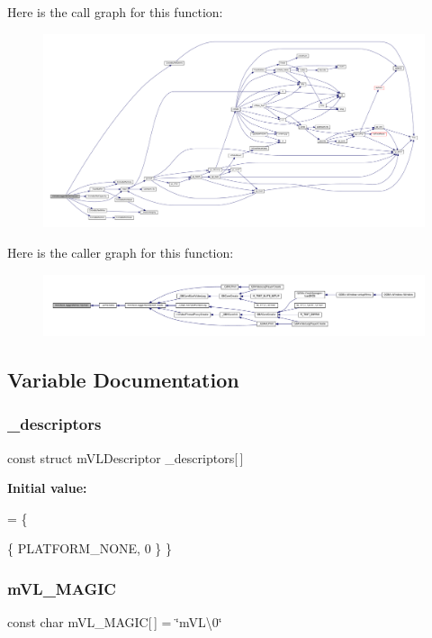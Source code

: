 Here is the call graph for this function\+:
\nopagebreak
\begin{figure}[H]
\begin{center}
\leavevmode
\includegraphics[width=350pt]{video-logger_8c_a4ff0364da23c84ee35e9e6cd4118a1bb_cgraph}
\end{center}
\end{figure}
Here is the caller graph for this function\+:
\nopagebreak
\begin{figure}[H]
\begin{center}
\leavevmode
\includegraphics[width=350pt]{video-logger_8c_a4ff0364da23c84ee35e9e6cd4118a1bb_icgraph}
\end{center}
\end{figure}


\subsection{Variable Documentation}
\mbox{\label{video-logger_8c_a787ded6be63576e12586e834b8a96b6b}} 
\subsubsection{\texorpdfstring{\+\_\+descriptors}{\_descriptors}}
{\footnotesize\ttfamily const struct m\+V\+L\+Descriptor  \+\_\+descriptors\mbox{[}$\,$\mbox{]}\hspace{0.3cm}{\ttfamily [static]}}

{\bfseries Initial value\+:}
\begin{DoxyCode}
= \{






    \{ PLATFORM\_NONE, 0 \}
\}
\end{DoxyCode}
\mbox{\label{video-logger_8c_a5d1620a649e7d23e38b4a81320d2e690}} 
\subsubsection{\texorpdfstring{m\+V\+L\+\_\+\+M\+A\+G\+IC}{mVL\_MAGIC}}
{\footnotesize\ttfamily const char m\+V\+L\+\_\+\+M\+A\+G\+IC\mbox{[}$\,$\mbox{]} = \char`\"{}m\+V\+L\textbackslash{}0\char`\"{}}

